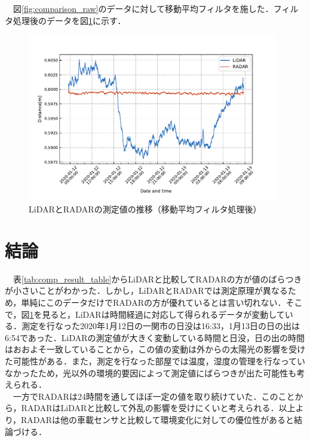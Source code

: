 　図\ref{fig:comparison_raw}のデータに対して移動平均フィルタを施した．フィルタ処理後のデータを図\ref{fig:comparison_filtered60}に示す．
\begin{figure}[H]
    \centering
    \includegraphics[width=11cm]{./fig/comparison_filtered60.pdf}
    \caption{LiDARとRADARの測定値の推移（移動平均フィルタ処理後）}
    \label{fig:comparison_filtered60}
\end{figure}

\section{結論}
　表\ref{tab:comp_result_table}からLiDARと比較してRADARの方が値のばらつきが小さいことがわかった．しかし，LiDARとRADARでは測定原理が異なるため，単純にこのデータだけでRADARの方が優れているとは言い切れない．そこで，図\ref{fig:comparison_filtered60}を見ると，LiDARは時間経過に対応して得られるデータが変動している．測定を行なった2020年1月12日の一関市の日没は16:33，1月13日の日の出は6:54であった．LiDARの測定値が大きく変動している時間と日没，日の出の時間はおおよそ一致していることから，この値の変動は外からの太陽光の影響を受けた可能性がある．また，測定を行なった部屋では温度，湿度の管理を行なっていなかったため，光以外の環境的要因によって測定値にばらつきが出た可能性も考えられる．\\
　一方でRADARは24時間を通してほぼ一定の値を取り続けていた．このことから，RADARはLiDARと比較して外乱の影響を受けにくいと考えられる．以上より，RADARは他の車載センサと比較して環境変化に対しての優位性があると結論づける．